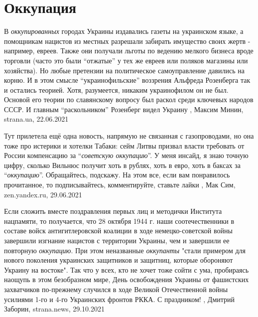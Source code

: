  
 
 
 
 
\chapter{Оккупация}
\label{sec:slova.okkupacia}

В \emph{оккупированных} городах Украины издавались газеты на украинском языке,
а помощникам нацистов из местных разрешали забирать имущество своих жертв -
например, евреев. Также они получали льготы по ведению мелкого бизнеса вроде
торговли (часто это были \enquote{отжатые} у тех же евреев или поляков магазины или
хозяйства).  Но любые претензии на политическое самоуправление давились на
корню. И в этом смысле \enquote{украинофильские} воззрения Альфреда Розенберга так и
остались теорией. Хотя, разумеется, никаким украинофилом он не был. Основой его
теории по славянскому вопросу был раскол среди ключевых народов СССР. И главным
\enquote{раскольником} Розенберг видел Украину 
, Максим Минин, strana.ua, 22.06.2021


Тут прилетела ещё одна новость, напрямую не связанная с газопроводами, но она
тоже про истерики и хотелки Табаки: сейм Литвы призвал власти требовать от
России компенсацию за \enquote{\emph{советскую оккупацию}}. У меня инсайд, я
знаю точную цифру, сколько Вильнюс получит хоть в рублях, хоть в евро, хоть в
баксах за \enquote{\emph{оккупацию}}. Обращайтесь, подскажу.  На этом все, если
вам понравилось прочитанное, то подписывайтесь, комментируйте, ставьте лайки
, 
Мак Сим, zen.yandex.ru, 29.06.2021

Если сложить вместе поздравления первых лиц и методички Института нацпамяти, то
получается, что 28 октября 1944 г. наши соотечественники в составе войск
антигитлеровской коалиции в ходе немецко-советской войны завершили изгнание
нацистов с территории Украины, чем и завершили ее повторную \emph{оккупацию}. При этом
неназванные \emph{оккупанты} "стали примером для нового поколения украинских
защитников и защитниц, которые обороняют Украину на востоке".  Так что у всех,
кто не хочет тоже сойти с ума, пробираясь наощупь в этом безобразном мире, День
освобождения Украины от фашистских захватчиков по-прежнему случился в ходе
Великой Отечественной войны усилиями 1-го и 4-го Украинских фронтов РККА.  С
праздником!
, 
Дмитрий Заборин, strana.news, 29.10.2021

